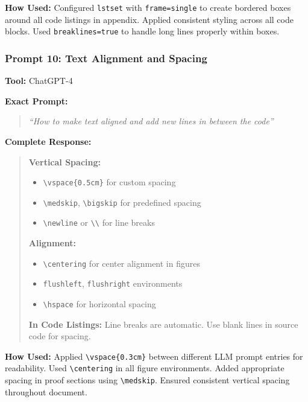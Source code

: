 \documentclass[conference]{IEEEtran}
\begin{document}
\textbf{How Used:}
Configured \texttt{lstset} with \texttt{frame=single} to create bordered boxes around all code listings in appendix. Applied consistent styling across all code blocks. Used \texttt{breaklines=true} to handle long lines properly within boxes.

\vspace{0.4cm}

\subsubsection{Prompt 10: Text Alignment and Spacing}

\textbf{Tool:} ChatGPT-4

\textbf{Exact Prompt:}
\begin{quote}
\textit{``How to make text aligned and add new lines in between the code''}
\end{quote}

\textbf{Complete Response:}
\begin{quote}
\small
\textbf{Vertical Spacing:}
\begin{itemize}
    \item \texttt{\textbackslash vspace\{0.5cm\}} for custom spacing
    \item \texttt{\textbackslash medskip}, \texttt{\textbackslash bigskip} for predefined spacing
    \item \texttt{\textbackslash newline} or \texttt{\textbackslash \textbackslash} for line breaks
\end{itemize}

\textbf{Alignment:}
\begin{itemize}
    \item \texttt{\textbackslash centering} for center alignment in figures
    \item \texttt{flushleft}, \texttt{flushright} environments
    \item \texttt{\textbackslash hspace} for horizontal spacing
\end{itemize}

\textbf{In Code Listings:}
Line breaks are automatic. Use blank lines in source code for spacing.
\end{quote}

\textbf{How Used:}
Applied \texttt{\textbackslash vspace\{0.3cm\}} between different LLM prompt entries for readability. Used \texttt{\textbackslash centering} in all figure environments. Added appropriate spacing in proof sections using \texttt{\textbackslash medskip}. Ensured consistent vertical spacing throughout document.
\end{document}
